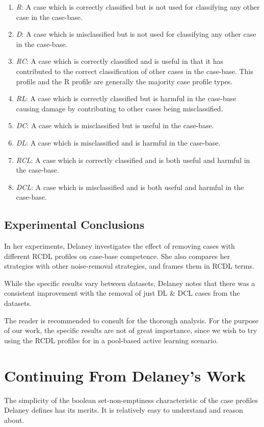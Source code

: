 \documentclass[a4paper,11pt]{report}
\begin{document}
\begin{enumerate}
	\item \emph{R}: A case which is correctly classified but is not used for classifying any other case in the case-base.
	\item \emph{D}: A case which is misclassified but is not used for classifying any other case in the case-base.
	\item \emph{RC}: A case which is correctly classified and is useful in that it has contributed to the correct classification of other cases in the case-base. This profile and the R profile are generally the majority case profile types.
	\item \emph{RL}: A case which is correctly classified but is harmful in the case-base causing damage by contributing to other cases being misclassified.
	\item \emph{DC}: A case which is misclassified but is useful in the case-base. 
	\item \emph{DL}: A case which is misclassified and is harmful in the case-base.
	\item \emph{RCL}: A case which is correctly classified and is both useful and harmful in the case-base.
	\item \emph{DCL}: A case which is misclassified and is both useful and harmful in the case-base.
\end{enumerate}


\subsection{Experimental Conclusions}
In her experiments, Delaney investigates the effect of removing cases with different RCDL profiles on case-base competence. She also compares her strategies with other noise-removal strategies, and frames them in RCDL terms.

While the specific results vary between datasets, Delaney notes that there was a consistent improvement with the removal of just DL \& DCL cases from the datasets. 

The reader is recommended to consult \citet{Delany2009} for the thorough analysis. For the purpose of our work, the specific results are not of great importance, since we wish to try using the RCDL profiles for in a pool-based active learning scenario.

\section{Continuing From Delaney's Work}
The simplicity of the boolean set-non-emptiness characteristic of the case profiles Delaney defines has its merits. It is relatively easy to understand and reason about. 
\end{document}
